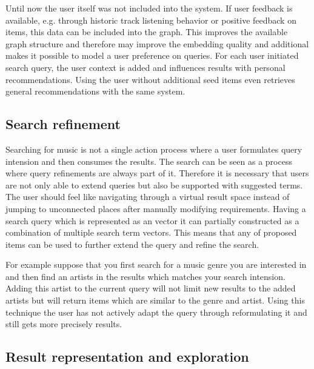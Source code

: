 \documentclass[sigconf]{acmart}
\begin{document}
Until now the user itself was not included into the system. If user feedback is available, e.g. through historic track listening behavior or positive feedback on items, this data can be included into the graph. This improves the available graph structure and therefore may improve the embedding quality and additional makes it possible to model a user preference on queries. For each user initiated search query, the user context is added and influences results with personal recommendations. Using the user without additional seed items even retrieves general recommendations with the same system.


\subsection{Search refinement}

Searching for music is not a single action process where a user formulates query intension and then consumes the results. The search can be seen as a process where query refinements are always part of it. Therefore it is necessary that users are not only able to extend queries but also be supported with suggested terms. The user should feel like navigating through a virtual result space instead of jumping to unconnected places after manually modifying requirements. Having a search query which is represented as an vector it can partially constructed as a combination of multiple search term vectors. This means that any of proposed items can be used to further extend the query and refine the search.

For example suppose that you first search for a music genre you are interested in and then find an artists in the results which matches your search intension. Adding this artist to the current query will not limit new results to the added artists but will return items which are similar to the genre and artist. Using this technique the user has not actively adapt the query through reformulating it and still gets more precisely results. \\

\subsection{Result representation and exploration}
\end{document}
